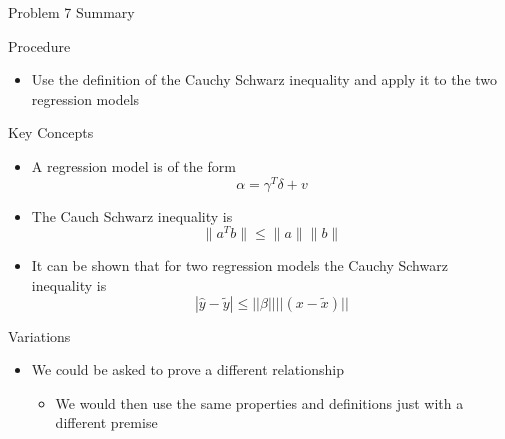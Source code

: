 \begin{summary}{Problem 7 Summary}
    \begin{statement}{Procedure}
        \begin{itemize}
            \item Use the definition of the Cauchy Schwarz inequality and apply it to the two regression models
        \end{itemize}
    \end{statement}
    \begin{statement}{Key Concepts}
        \begin{itemize}
            \item A regression model is of the form
            \begin{equation*}
                \alpha = \gamma^{T}\delta + v
            \end{equation*}
            \item The Cauch Schwarz inequality is
            \begin{equation*}
                \|a^{T}b\| \leq \|a\|\|b\|
            \end{equation*}
            \item It can be shown that for two regression models the Cauchy Schwarz inequality is 
            \begin{equation*}
                |\hat{y} - \tilde{y}| \leq ||\beta||||(x - \tilde{x})||
            \end{equation*}
        \end{itemize}
    \end{statement}
    \begin{statement}{Variations}
        \begin{itemize}
            \item We could be asked to prove a different relationship
            \begin{itemize}
                \item We would then use the same properties and definitions just with a different premise
            \end{itemize}
        \end{itemize}
    \end{statement}
\end{summary}

